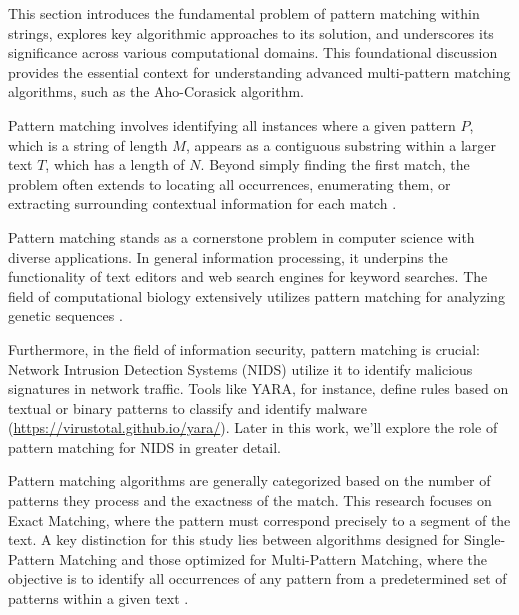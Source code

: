 


This section introduces the fundamental problem of pattern matching within strings, explores key algorithmic approaches to its solution, and underscores its significance across various computational domains. This foundational discussion provides the essential context for understanding advanced multi-pattern matching algorithms, such as the Aho-Corasick algorithm.


Pattern matching involves identifying all instances where a given pattern $P$, which is a string of length $M$, appears as a contiguous substring within a larger text $T$, which has a length of $N$. Beyond simply finding the first match, the problem often extends to locating all occurrences, enumerating them, or extracting surrounding contextual information for each match \cite{SedgewickWayne2011}.


Pattern matching stands as a cornerstone problem in computer science with diverse applications. In general information processing, it underpins the functionality of text editors and web search engines for keyword searches. The field of computational biology extensively utilizes pattern matching for analyzing genetic sequences \cite{SedgewickWayne2011}.

Furthermore, in the field of information security, pattern matching is crucial: Network Intrusion Detection Systems (NIDS) utilize it to identify malicious signatures in network traffic. Tools like YARA, for instance, define rules based on textual or binary patterns to classify and identify malware (\url{https://virustotal.github.io/yara/}). Later in this work, we’ll explore the role of pattern matching for NIDS in greater detail.


Pattern matching algorithms are generally categorized based on the number of patterns they process and the exactness of the match. This research focuses on Exact Matching, where the pattern must correspond precisely to a segment of the text. A key distinction for this study lies between algorithms designed for Single-Pattern Matching and those optimized for Multi-Pattern Matching, where the objective is to identify all occurrences of any pattern from a predetermined set of patterns within a given text \cite{AhoCorasick1975, Gusfield1997}.

